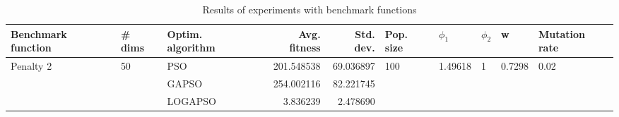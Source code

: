 \begin{table}
\centering
\caption{Results of experiments with benchmark functions}
\begin{tabular}{lllrrlllll}
\toprule
        Benchmark function &             \# dims & Optim. algorithm &  Avg. fitness &  Std. dev. &            Pop. size &               $\phi_{1}$ &         $\phi_{2}$ &                       w &         Mutation rate \\
\midrule
\multirow{3}{*}{Penalty 2} & \multirow{3}{*}{50} &              PSO &    201.548538 &  69.036897 & \multirow{3}{*}{100} & \multirow{3}{*}{1.49618} & \multirow{3}{*}{1} & \multirow{3}{*}{0.7298} & \multirow{3}{*}{0.02} \\
                           &                     &            GAPSO &    254.002116 &  82.221745 &                      &                          &                    &                         &                       \\
                           &                     &          LOGAPSO &      3.836239 &   2.478690 &                      &                          &                    &                         &                       \\
\bottomrule
\end{tabular}
\end{table}
